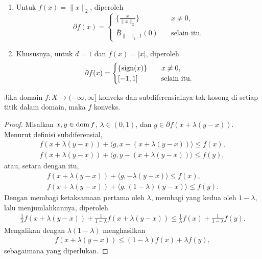 \Needspace{0.50\textheight}
\begin{example}\
    \begin{enumerate}
        \item Untuk $f(x)=\|x\|_2$, diperoleh
        \[
            \partial f(x)
            = \begin{cases}
                \{\frac{x}{\|x\|_2}\}\quad& x\neq 0,\\
                \overline{B}_{\|\cdot\|_2,1}(0)\quad&\text{selain itu}.
            \end{cases}
        \]
        \item Khususnya, untuk $d=1$ dan $f(x)=|x|$, diperoleh
        \[
            \partial f(x)
            = \begin{cases}
                \{\operatorname{\mathrm{sign}}(x)\}\quad& x\neq 0,\\
                [-1,1]\quad&\text{selain itu}.
            \end{cases}
        \]
    \end{enumerate}
\end{example}

\begin{lemma}
    Jika domain $f:X\rightarrow(-\infty,\infty]$ konveks dan subdiferensialnya tak kosong di setiap titik dalam domain, maka $f$ konveks.
\end{lemma}
\begin{proof}
    Misalkan $x,y\in \operatorname{\mathrm{dom}} f$, $\lambda\in (0,1)$, dan $g\in \partial f(x+\lambda (y-x))$.
    Menurut definisi subdiferensial,
    \begin{gather}
        f(x+\lambda(y-x)) + \langle g, x - (x+\lambda(y-x))\rangle \leq f(x),\\
        f(x+\lambda(y-x)) + \langle g, y - (x+\lambda(y-x))\rangle \leq f(y),
    \end{gather}
    atau, setara dengan itu,
    \begin{gather}
        f(x+\lambda(y-x)) + \langle g, -\lambda(y-x)\rangle \leq f(x),\\
        f(x+\lambda(y-x)) + \langle g, (1-\lambda)(y - x) \rangle \leq f(y).
    \end{gather}
    Dengan membagi ketaksamaan pertama oleh $\lambda$, membagi yang kedua oleh $1-\lambda$, lalu menjumlahkannya, diperoleh
    \begin{equation}
        \begin{aligned}
            \frac{1}{\lambda} f(x+\lambda(y-x)) + \frac{1}{1-\lambda} f(x+\lambda(y-x))\leq \frac{1}{\lambda} f(x) + \frac{1}{1-\lambda} f(y).
        \end{aligned}
    \end{equation}
    Mengalikan dengan $\lambda (1-\lambda)$ menghasilkan
    \begin{equation}
        \begin{aligned}
            f(x+\lambda(y-x)) \leq (1-\lambda) f(x) + \lambda f(y),
        \end{aligned}
    \end{equation}
    sebagaimana yang diperlukan.
\end{proof}

